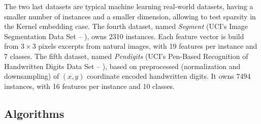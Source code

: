 \documentclass[preprint,12pt,authoryear]{elsarticle}
\begin{document}

The two last datasets are typical machine learning real-world datasets, having a smaller number of instances and a smaller dimension, allowing to test sparsity in the Kernel embedding case.   
The fourth dataset, named  \textit{Segment} (UCI's Image Segmentation Data Set -- \cite{Lichman:2013}), owns 2310 instances. Each feature vector is build from $3\times3$ pixels excerpts from natural images, with 19 features per instance and 7 classes. 
The fifth dataset, named \textit{Pendigits} (UCI's Pen-Based Recognition of Handwritten Digits Data Set -- \cite{alimoglu1996combining}), based on preprocessed (normalization and downsampling) of $(x,y)$ coordinate encoded handwritten digits. It owns 7494 instances, with 16 features per instance and 10 classes. 




\subsection{Algorithms}
\end{document}

